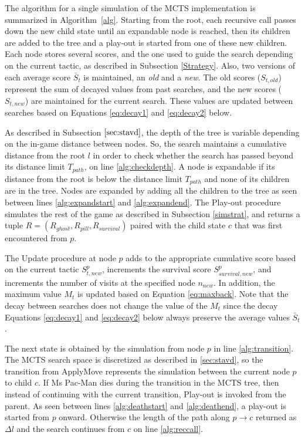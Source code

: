 \documentclass[journal]{IEEEtran}
\begin{document}
The algorithm for a single simulation of the MCTS implementation is summarized in Algorithm~\ref{alg}. Starting from the root, each recursive call passes down the new child state until an expandable node is reached, then its children are added to the tree and a play-out is started from one of these new children. Each node stores several scores, and the one used to guide the search depending on the current tactic, as described in Subsection \ref{Strategy}. Also, two versions of each average score $\bar{S}_t$ is maintained, an \emph{old} and a \emph{new}. The old scores ($S_{t,old}$) represent the sum of decayed values from past searches, and the new scores ($S_{t,new}$) are maintained for the current search. These values are updated between searches based on Equations \ref{eq:decay1} and \ref{eq:decay2} below. %

As described in Subsection $\ref{sec:stavd}$, the depth of the tree is variable depending on the in-game distance between nodes. So, the search maintains a cumulative distance from the root $l$ in order to check whether the search has passed beyond its distance limit $T_{path}$, on line \ref{alg:checkdepth}. A node is expandable if its distance from the root is below the distance limit $T_{path}$ and none of its children are in the tree. Nodes are expanded by adding all the children to the tree as seen between lines \ref{alg:expandstart} and \ref{alg:expandend}. The {\sc Play-out} procedure simulates the rest of the game as described in Subsection \ref{simstrat}, and returns a tuple $R = (R_{ghost}, R_{pill}, R_{survival})$ paired with the child state $c$ that was first encountered from $p$. 

The {\sc Update} procedure at node $p$ adds to the appropriate cumulative score based on the current tactic $S^p_{t,new}$, increments the survival score $S^p_{survival,new}$, and increments the number of visits at the specified node $n_{new}$. In addition, the maximum value $M_t$ is updated based on Equation \ref{eq:maxback}. Note that the decay between searches does not change the value of the $M_t$ since the decay Equations \ref{eq:decay1} and \ref{eq:decay2} below always preserve the average values $\bar{S}_t$.

The next state is obtained by the simulation from node $p$ in line \ref{alg:transition}. The MCTS search space is discretized as described in \ref{sec:stavd}, so the transition from {\sc ApplyMove} represents the simulation between the current node $p$ to child $c$. If Ms Pac-Man dies during the transition in the MCTS tree, then instead of continuing with the current transition, {\sc Play-out} is invoked from the parent. As seen between lines \ref{alg:deathstart} and \ref{alg:deathend}, a play-out is started from $p$ onward. Otherwise the length of the path along $p \rightarrow c$ returned as $\Delta l$ and the search continues from $c$ on line \ref{alg:reccall}. %
\end{document}
